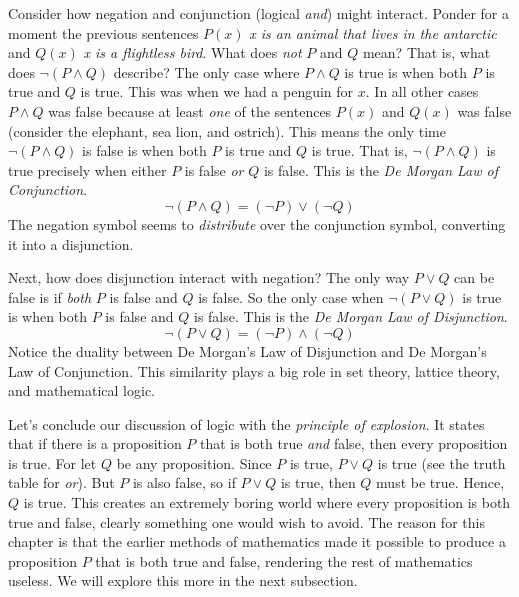             \par\hfill\par
            Consider how negation and conjunction (logical \textit{and}) might
            interact. Ponder for a moment the previous sentences
            $P(x)$ \textit{x is an animal that lives in the antarctic} and
            $Q(x)$ \textit{x is a flightless bird}. What does
            \textit{not} $P$ and $Q$ mean? That is, what does
            $\neg(P\land{Q})$ describe? The only case where $P\land{Q}$ is true
            is when both $P$ is true and $Q$ is true. This was when we had a
            penguin for $x$. In all other cases $P\land{Q}$ was false because
            at least \textit{one} of the sentences $P(x)$ and $Q(x)$ was false
            (consider the elephant, sea lion, and ostrich). This means the only
            time $\neg(P\land{Q})$ is false is when both $P$ is true and $Q$ is
            true. That is, $\neg(P\land{Q})$ is true precisely when either $P$
            is false \textit{or} $Q$ is false. This is the
            \textit{De Morgan Law of Conjunction}.
            \begin{equation}
                \neg(P\land{Q})=(\neg{P})\lor(\neg{Q})
            \end{equation}
            The negation symbol seems to \textit{distribute} over the
            conjunction symbol, converting it into a disjunction.
            \par\hfill\par
            Next, how does disjunction interact with negation? The only way
            $P\lor{Q}$ can be false is if \textit{both} $P$ is false and $Q$ is
            false. So the only case when $\neg(P\lor{Q})$ is true is when both
            $P$ is false and $Q$ is false. This is the
            \textit{De Morgan Law of Disjunction}.
            \begin{equation}
                \neg(P\lor{Q})=(\neg{P})\land(\neg{Q})
            \end{equation}
            Notice the duality between De Morgan's Law of Disjunction and
            De Morgan's Law of Conjunction. This similarity plays a big role
            in set theory, lattice theory, and mathematical logic.
            \par\hfill\par
            Let's conclude our discussion of logic with the
            \textit{principle of explosion}. It states that if there is a
            proposition $P$ that is both true \textit{and} false, then every
            proposition is true. For let $Q$ be any proposition. Since $P$ is
            true, $P\lor{Q}$ is true (see the truth table for \textit{or}). But
            $P$ is also false, so if $P\lor{Q}$ is true, then $Q$ must be true.
            Hence, $Q$ is true. This creates an extremely boring world where
            every proposition is both true and false, clearly something one
            would wish to avoid. The reason for this chapter is that the earlier
            methods of mathematics made it possible to produce a proposition
            $P$ that is both true and false, rendering the rest of mathematics
            useless. We will explore this more in the next subsection.
